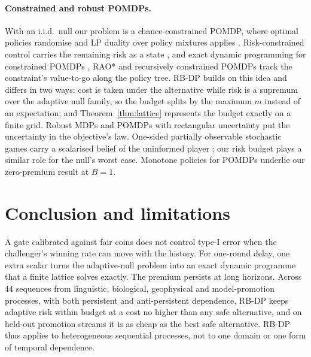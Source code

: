 \documentclass{article}
\theoremstyle{plain}
\theoremstyle{definition}
\theoremstyle{remark}
\begin{document}
\paragraph{Constrained and robust POMDPs.} With an i.i.d.\ null our problem is a chance-constrained POMDP, where optimal policies randomise and LP duality over policy mixtures applies \citep{altman1999constrained,yost2000lp,walraven2018column}. Risk-constrained control carries the remaining risk as a state \citep{chow2013stochastic}, and exact dynamic programming for constrained POMDPs \citep{isom2008piecewise}, RAO* \citep{santana2016rao} and recursively constrained POMDPs \citep{ho2024recursively} track the constraint's value-to-go along the policy tree. RB-DP builds on this idea and differs in two ways: cost is taken under the alternative while risk is a supremum over the adaptive null family, so the budget splits by the maximum $m$ instead of an expectation; and Theorem~\ref{thm:lattice} represents the budget exactly on a finite grid. Robust MDPs and POMDPs with rectangular uncertainty \citep{iyengar2005robust,nilim2005robust,krale2025evaluating} put the uncertainty in the objective's law. One-sided partially observable stochastic games carry a scalarised belief of the uninformed player \citep{horak2023solving}; our risk budget plays a similar role for the null's worst case. Monotone policies for POMDPs \citep{krishnamurthy2016pomdp} underlie our zero-premium result at $B=1$.


\section{Conclusion and limitations}
\label{sec:conclusion}
\label{sec:limitations}

A gate calibrated against fair coins does not control type-I error when the challenger's winning rate can move with the history. For one-round delay, one extra scalar turns the adaptive-null problem into an exact dynamic programme that a finite lattice solves exactly. The premium persists at long horizons. Across 44 sequences from linguistic, biological, geophysical and model-promotion processes, with both persistent and anti-persistent dependence, RB-DP keeps adaptive risk within budget at a cost no higher than any safe alternative, and on held-out promotion streams it is as cheap as the best safe alternative. RB-DP thus applies to heterogeneous sequential processes, not to one domain or one form of temporal dependence.
\end{document}
